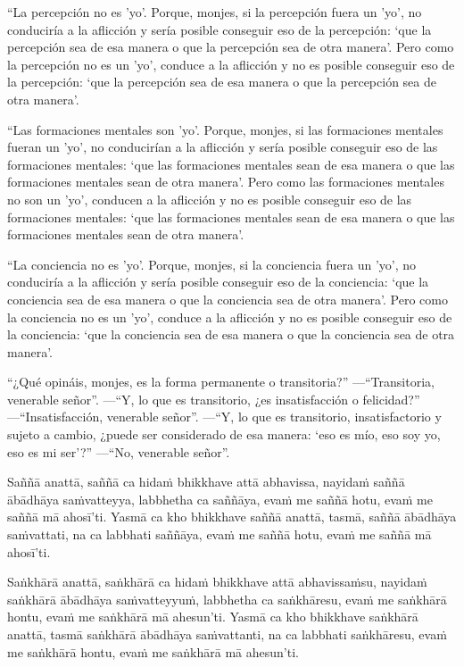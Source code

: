 \clearpage

\englishText
\markboth{\englishTitle}{\rightmark}

“La percepción no es 'yo'. Porque, monjes, si la percepción fuera un 'yo', no conduciría a la aflicción y sería posible conseguir eso de la percepción: ‘que la percepción sea de esa manera o que la percepción sea de otra manera’. Pero como la percepción no es un 'yo', conduce a la aflicción y no es posible conseguir eso de la percepción: ‘que la percepción sea de esa manera o que la percepción sea de otra manera’.

“Las formaciones mentales son 'yo'. Porque, monjes, si las formaciones mentales fueran un 'yo', no conducirían a la aflicción y sería posible conseguir eso de las formaciones mentales: ‘que las formaciones mentales sean de esa manera o que las formaciones mentales sean de otra manera’. Pero como las formaciones mentales no son un 'yo', conducen a la aflicción y no es posible conseguir eso de las formaciones mentales: ‘que las formaciones mentales sean de esa manera o que las formaciones mentales sean de otra manera’.

“La conciencia no es 'yo'. Porque, monjes, si la conciencia fuera un 'yo', no conduciría a la aflicción y sería posible conseguir eso de la conciencia: ‘que la conciencia sea de esa manera o que la conciencia sea de otra manera’. Pero como la conciencia no es un 'yo', conduce a la aflicción y no es posible conseguir eso de la conciencia: ‘que la conciencia sea de esa manera o que la conciencia sea de otra manera’.

“¿Qué opináis, monjes, es la forma permanente o transitoria?”
—“Transitoria, venerable señor”.
—“Y, lo que es transitorio, ¿es insatisfacción o felicidad?”
—“Insatisfacción, venerable señor”.
—“Y, lo que es transitorio, insatisfactorio y sujeto a cambio, ¿puede ser considerado de esa manera: ‘eso es mío, eso soy yo, eso es mi ser’?”
—“No, venerable señor”.



\clearpage

\paliText
\markboth{\paliTitle}{\rightmark}

Saññā anattā, saññā ca hidaṁ bhikkhave attā abhavissa, nayidaṁ saññā ābādhāya
saṁvatteyya, labbhetha ca saññāya, evaṁ me saññā hotu, evaṁ me saññā mā
ahosī'ti. Yasmā ca kho bhikkhave saññā anattā, tasmā, saññā ābādhāya saṁvattati,
na ca labbhati saññāya, evaṁ me saññā hotu, evaṁ me saññā mā ahosī'ti.

Saṅkhārā anattā, saṅkhārā ca hidaṁ bhikkhave attā abhavissaṁsu, nayidaṁ saṅkhārā
ābādhāya saṁvatteyyuṁ, labbhetha ca saṅkhāresu, evaṁ me saṅkhārā hontu, evaṁ me
saṅkhārā mā ahesun'ti. Yasmā ca kho bhikkhave saṅkhārā anattā, tasmā saṅkhārā
ābādhāya saṁvattanti, na ca labbhati saṅkhāresu, evaṁ me saṅkhārā hontu, evaṁ me
saṅkhārā mā ahesun'ti.

